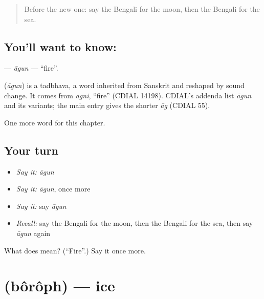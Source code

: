 \label{lesson:BN-C67-agun}



\begin{quote}
Before the new one: say the Bengali for the moon, then the Bengali for the sea.
\end{quote}

\subsection*{You'll want to know: }
\textbf{} — \emph{āgun} — \textquotedblleft{}fire\textquotedblright{}.

\begin{cousinweb}
\textbf{} (\emph{āgun}) is a tadbhava, a word inherited from Sanskrit and reshaped by sound change. It comes from \emph{agni}, \textquotedblleft{}fire\textquotedblright{} (CDIAL 14198). CDIAL's addenda list \emph{āgun} and its variants; the main entry gives the shorter \emph{āg} (CDIAL 55).
\end{cousinweb}

\begin{grammarlens}[title={What you've built}]
One more word for this chapter.
\end{grammarlens}

\subsection*{Your turn}
\begin{itemize}
\raggedright
  \item \emph{Say it:} \emph{āgun}
  \item \emph{Say it:} \emph{āgun}, once more
  \item \emph{Say it:} say \emph{āgun}
  \item \emph{Recall:} say the Bengali for the moon, then the Bengali for the sea, then say \emph{āgun} again
\end{itemize}

\begin{tcolorbox}[breakable,colback=teal!4,colframe=teal!35!black,title={Before you move on}]
What does  mean? (\textquotedblleft{}Fire\textquotedblright{}.) Say it once more.
\end{tcolorbox}
\section[\texorpdfstring{\bn{বরফ} (bôrôph)}{বরফ (bôrôph)}]{ (bôrôph) — ice}

